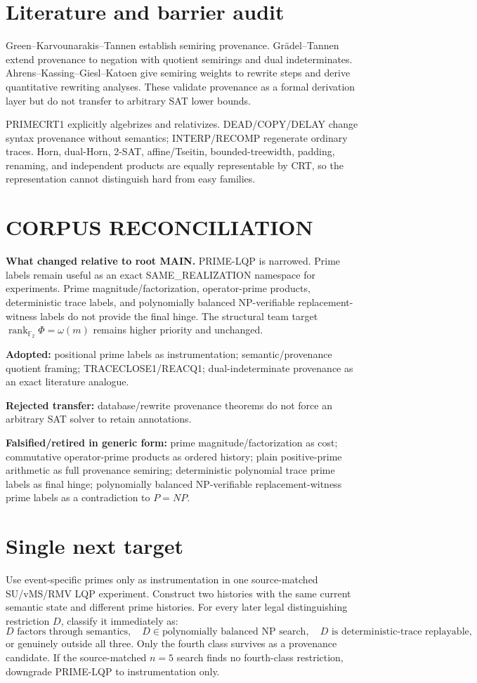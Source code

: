 \documentclass[11pt]{article}
\begin{document}
\section*{Literature and barrier audit}
Green--Karvounarakis--Tannen establish semiring provenance. Gr\"adel--Tannen extend provenance to negation with quotient semirings and dual indeterminates. Ahrens--Kassing--Giesl--Katoen give semiring weights to rewrite steps and derive quantitative rewriting analyses. These validate provenance as a formal derivation layer but do not transfer to arbitrary SAT lower bounds.

PRIMECRT1 explicitly algebrizes and relativizes. DEAD/COPY/DELAY change syntax provenance without semantics; INTERP/RECOMP regenerate ordinary traces. Horn, dual-Horn, 2-SAT, affine/Tseitin, bounded-treewidth, padding, renaming, and independent products are equally representable by CRT, so the representation cannot distinguish hard from easy families.

\section*{CORPUS RECONCILIATION}
\textbf{What changed relative to root MAIN.}
PRIME-LQP is narrowed. Prime labels remain useful as an exact SAME\_REALIZATION namespace for experiments. Prime magnitude/factorization, operator-prime products, deterministic trace labels, and polynomially balanced NP-verifiable replacement-witness labels do not provide the final hinge. The structural team target \(\operatorname{rank}_{\mathbb F_2}\Phi=\omega(m)\) remains higher priority and unchanged.

\textbf{Adopted:} positional prime labels as instrumentation; semantic/provenance quotient framing; TRACECLOSE1/REACQ1; dual-indeterminate provenance as an exact literature analogue.

\textbf{Rejected transfer:} database/rewrite provenance theorems do not force an arbitrary SAT solver to retain annotations.

\textbf{Falsified/retired in generic form:} prime magnitude/factorization as cost; commutative operator-prime products as ordered history; plain positive-prime arithmetic as full provenance semiring; deterministic polynomial trace prime labels as final hinge; polynomially balanced NP-verifiable replacement-witness prime labels as a contradiction to \(P=NP\).

\section*{Single next target}
Use event-specific primes only as instrumentation in one source-matched SU/vMS/RMV LQP experiment. Construct two histories with the same current semantic state and different prime histories. For every later legal distinguishing restriction \(D\), classify it immediately as:
\[
D\text{ factors through semantics},\quad
D\in\text{polynomially balanced NP search},\quad
D\text{ is deterministic-trace replayable},
\]
or genuinely outside all three. Only the fourth class survives as a provenance candidate. If the source-matched \(n=5\) search finds no fourth-class restriction, downgrade PRIME-LQP to instrumentation only.
\end{document}
